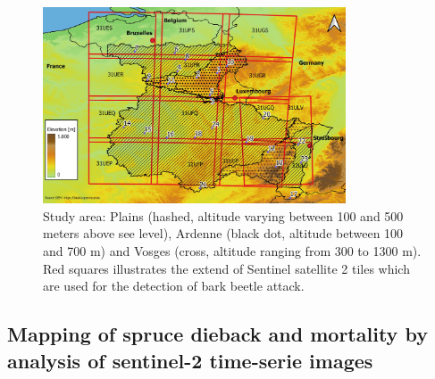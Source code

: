 \documentclass[3p,procedia]{elsarticle}
\begin{document}
\begin{figure} [htbp] 
	\centering
	\includegraphics[width=0.8\textwidth]{gde.jpeg}
	\caption{Study area: Plains (hashed, altitude varying between 100 and 500 meters above see level), Ardenne (black dot, altitude between 100 and 700 m) and Vosges (cross, altitude ranging from 300 to 1300 m). Red squares illustrates the extend of Sentinel satellite 2 tiles which are used for the detection of bark beetle attack.}
	\label{fig:situ}
\end{figure}

\subsection{Mapping of spruce dieback and mortality by analysis of sentinel-2 time-serie images}
\end{document}
